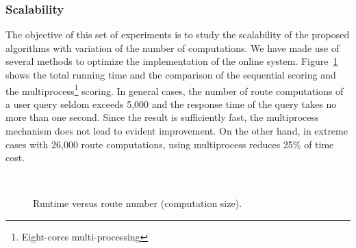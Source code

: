 \subsubsection{Scalability} \label{subsec:scale}
The objective of this set of experiments is to study the scalability of the proposed algorithms with variation of the number of computations. We have made use of several methods to optimize the implementation of the online system. Figure~\ref{fig:scalability} shows the total running time and the comparison of the sequential scoring and the multiprocess\footnote{Eight-cores multi-processing} scoring. In general cases, the number of route computations of a user query seldom exceeds 5,000 and the response time of the query takes no more than one second. Since the result is sufficiently fast, the multiprocess mechanism does not lead to evident improvement. On the other hand, in extreme cases with 26,000 route computations, using multiprocess reduces 25\% of time cost.

\begin{figure}[h]
\centering
\mbox{
}
\caption{Runtime versus route number (computation size).}
\label{fig:scalability}
\end{figure}

